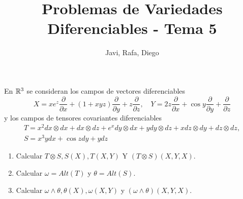 \documentclass[twoside]{article}
\begin{document}
\title{Problemas de Variedades Diferenciables - Tema 5}
\author{Javi, Rafa, Diego}
\maketitle

\begin{ejercicio}{1}
En $\mathbb{R}^3$ se consideran los campos de vectores diferenciables 
$$X=xe^z\frac{\partial}{\partial x}+(1+xyz)\frac{\partial}{\partial y}+z\frac{\partial}{\partial z},\quad Y=2z\frac{\partial}{\partial x}+\cos{y}\frac{\partial}{\partial y}+\frac{\partial}{\partial z}$$
y los campos de tensores covariantes diferenciables
\begin{gather*}
T=x^2dx\otimes dx+dx\otimes dz+e^xdy\otimes dx +ydy\otimes dz+xdz\otimes dy+dz\otimes dz,\\
S=x^3ydx+\cos{z}dy+ydz
\end{gather*}
\begin{enumerate}
\item Calcular $T\otimes S, S(X),T(X,Y)$ Y $(T\otimes S)(X,Y,X)$.
\item Calcular $\omega=Alt(T)$ y $\theta=Alt(S)$. 
\item Calcular $\omega\land\theta,\theta(X),\omega(X,Y)$ y $(\omega\land\theta)(X,Y,X)$.
\end{enumerate}
\end{ejercicio}
\end{document}
